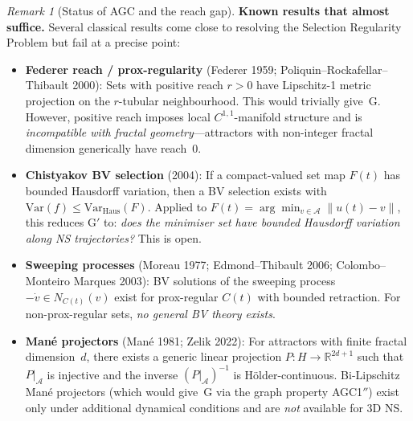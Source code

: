 \documentclass[12pt,a4paper]{article}
\theoremstyle{definition}
\theoremstyle{plain}
\theoremstyle{remark}
\newtheorem{remark}[definition]{Remark}
\begin{document}
\begin{remark}[Status of AGC and the reach gap]
\medskip\noindent
\textbf{Known results that almost suffice.}\;
Several classical results come close to resolving the Selection
Regularity Problem but fail at a precise point:
\begin{itemize}
  \item \textbf{Federer reach / prox-regularity}
    (Federer 1959; Poliquin--Rockafellar--Thibault 2000):
    Sets with positive reach $r > 0$ have Lipschitz-1 metric projection
    on the $r$-tubular neighbourhood. This would trivially give~G.
    However, positive reach imposes local $C^{1,1}$-manifold structure
    and is \emph{incompatible with fractal geometry}---attractors
    with non-integer fractal dimension generically have reach~$0$.
  \item \textbf{Chistyakov BV selection} (2004):
    If a compact-valued set map $F(t)$ has bounded Hausdorff variation,
    then a BV selection exists with
    $\mathrm{Var}(f) \le \mathrm{Var}_{\mathrm{Haus}}(F)$.
    Applied to $F(t) = \arg\min_{v \in \mathcal{A}} \|u(t)-v\|$,
    this reduces G$'$ to: \emph{does the minimiser set have bounded
    Hausdorff variation along NS trajectories?} This is open.
  \item \textbf{Sweeping processes}
    (Moreau 1977; Edmond--Thibault 2006; Colombo--Monteiro Marques 2003):
    BV solutions of the sweeping process $-\dot{v} \in N_{C(t)}(v)$
    exist for prox-regular $C(t)$ with bounded retraction.
    For non-prox-regular sets, \emph{no general BV theory exists}.
  \item \textbf{Man\'e projectors}
    (Man\'e 1981; Zelik 2022):
    For attractors with finite fractal dimension~$d$, there exists a
    generic linear projection $P : H \to \mathbb{R}^{2d+1}$ such that
    $P|_{\mathcal{A}}$ is injective and the inverse
    $(P|_{\mathcal{A}})^{-1}$ is H\"older-continuous.
    Bi-Lipschitz Man\'e projectors (which would give~G via the graph
    property AGC1$''$) exist only under additional dynamical conditions
    and are \emph{not} available for 3D NS.
\end{itemize}


\end{remark}
\end{document}
